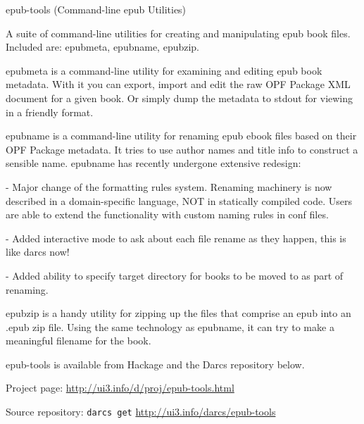 \begin{hcarentry}[updated]{epub-tools (Command-line epub Utilities)}
\label{epubtools}
\makeheader

A suite of command-line utilities for creating and manipulating epub book files. Included are: epubmeta, epubname, epubzip.

epubmeta is a command-line utility for examining and editing epub book metadata. With it you can export, import and edit the raw OPF Package XML document for a given book. Or simply dump the metadata to stdout for viewing in a friendly format.

epubname is a command-line utility for renaming epub ebook files based on their OPF Package metadata. It tries to use author names and title info to construct a sensible name. epubname has recently undergone extensive redesign:

- Major change of the formatting rules system. Renaming machinery is now described in a domain-specific language, NOT in statically compiled code. Users are able to extend the functionality with custom naming rules in conf files.

- Added interactive mode to ask about each file rename as they happen, this is like darcs now!

- Added ability to specify target directory for books to be moved to as part of renaming.

epubzip is a handy utility for zipping up the files that comprise an epub into an .epub zip file. Using the same technology as epubname, it can try to make a meaningful filename for the book.

epub-tools is available from Hackage and the Darcs repository below.

\FurtherReading
\begin{compactitem}
\item Project page:
\url{http://ui3.info/d/proj/epub-tools.html}

\item Source repository:
\texttt{darcs get} \url{http://ui3.info/darcs/epub-tools}
\end{compactitem}
\end{hcarentry}
